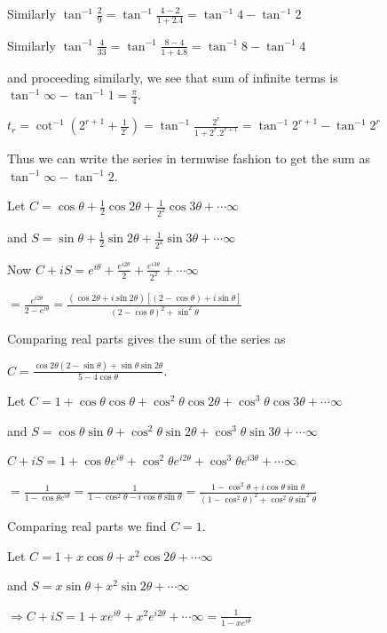   Similarly $\tan^{-1}\frac{2}{9} = \tan^{-1}\frac{4 - 2}{1 + 2.4} = \tan^{-1}4 - \tan^{-1}2$

  Similarly $\tan^{-1}\frac{4}{33} = \tan^{-1}\frac{8 - 4}{1 + 4.8} = \tan^{-1}8 - \tan^{-1}4$

  and proceeding similarly, we see that sum of infinite terms is $\tan^{-1}\infty - \tan^{-1}1 =
  \frac{\pi}{4}$.
\item $t_r = \cot^{-1}\left(2^{r + 1} + \frac{1}{2^r}\right) = \tan^{-1}\frac{2^r}{1 + 2^r.2^{r + 1}} =
  \tan^{-1}2^{r + 1} - \tan^{-1}2^r$

  Thus we can write the series in termwise fashion to get the sum as $\tan^{-1}\infty - \tan^{-1}2$.
\item Let $C = \cos\theta + \frac{1}{2}\cos2\theta + \frac{1}{2^2}\cos3\theta + \cdots \infty$

  and $S = \sin\theta + \frac{1}{2}\sin2\theta + \frac{1}{2^2}\sin3\theta + \cdots \infty$

  Now $C + iS = e^{i\theta} + \frac{e^{i2\theta}}{2} + \frac{e^{i3\theta}}{2^2} + \cdots \infty$

  $= \frac{e^{i2\theta}}{2 - e^{i\theta}} = \frac{(\cos2\theta + i\sin2\theta)[(2 - \cos\theta) +
      i\sin\theta]}{(2 - \cos\theta)^2 + \sin^2\theta}$

  Comparing real parts gives the sum of the series as

  $C = \frac{\cos2\theta(2 - \sin\theta) + \sin\theta\sin2\theta}{5 - 4\cos\theta}$.
\item Let $C = 1 + \cos\theta\cos\theta + \cos^2\theta\cos2\theta + \cos^3\theta\cos3\theta + \cdots \infty$

  and $S = \cos\theta\sin\theta + \cos^2\theta\sin2\theta + \cos^3\theta\sin3\theta + \cdots \infty$

  $C + iS = 1 + \cos\theta e^{i\theta} + \cos^2\theta e^{i2\theta} + \cos^3\theta e^{i3\theta} + \cdots
  \infty$

  $= \frac{1}{1 - \cos\theta e^{i\theta}} = \frac{1}{1 - \cos^2\theta - i\cos\theta\sin\theta} = \frac{1 -
    \cos^2\theta + i\cos\theta\sin\theta}{\left(1 - \cos^2\theta\right)^2 + \cos^2\theta\sin^2\theta}$

  Comparing real parts we find $C = 1$.
\item Let $C = 1 + x\cos\theta + x^2\cos2\theta + \cdots \infty$

  and $S = x\sin\theta + x^2\sin2\theta + \cdots \infty$

  $\Rightarrow C + iS = 1 + xe^{i\theta} + x^2e^{i2\theta} + \cdots \infty = \frac{1}{1 - xe^{i\theta}}$

